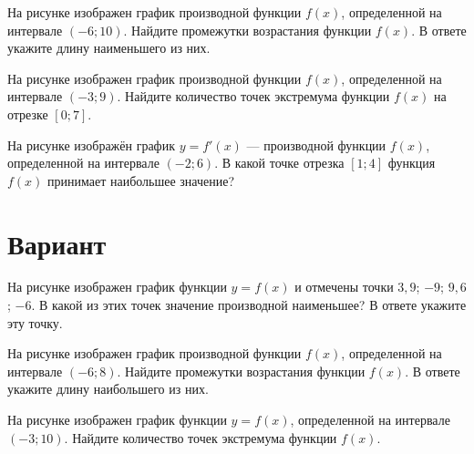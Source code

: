 \begin{taskBN}{2}
На рисунке изображен график производной функции $f(x)$, определенной на интервале $(-6;10)$. Найдите промежутки возрастания функции $f(x)$. В ответе укажите длину наименьшего из них.
\end{taskBN}

\begin{taskBN}{3}
На рисунке изображен график производной функции $f(x)$, определенной на интервале $(-3;9)$. Найдите количество точек экстремума функции $f(x)$ на отрезке $[0;7]$.
\end{taskBN}

\begin{taskBN}{4}
На рисунке изображён график $y=f'(x)$ — производной функции $f(x)$, определенной на интервале $(-2;6)$. В какой точке отрезка $[1; 4]$ функция $f(x)$ принимает наибольшее значение?
\end{taskBN}

\newpage\section{Вариант}\begin{taskBN}{1}
На рисунке изображен график функции $y=f(x)$ и отмечены точки $3,9$; $-9$; $9,6$; $-6$. В какой из этих точек значение производной наименьшее? В ответе укажите эту точку. 
\end{taskBN}

\begin{taskBN}{2}
На рисунке изображен график производной функции $f(x)$, определенной на интервале $(-6;8)$. Найдите промежутки возрастания функции $f(x)$. В ответе укажите длину наибольшего из них.
\end{taskBN}

\begin{taskBN}{3}
На рисунке изображен график функции $y=f(x)$, определенной на интервале $(-3;10)$. Найдите количество точек экстремума функции $f(x)$.
\end{taskBN}

